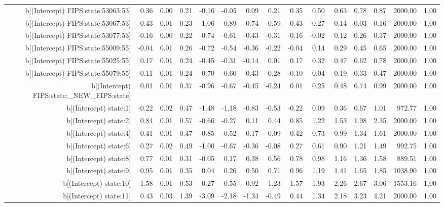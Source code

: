 \begin{table}[ht]
\begin{tabular}{rrrrrrrrrrrrrrr}
  b[(Intercept) FIPS:state:53063:53] & 0.36 & 0.00 & 0.21 & -0.16 & -0.05 & 0.09 & 0.21 & 0.35 & 0.50 & 0.63 & 0.78 & 0.87 & 2000.00 & 1.00 \\ 
  b[(Intercept) FIPS:state:53067:53] & -0.43 & 0.01 & 0.23 & -1.06 & -0.89 & -0.74 & -0.59 & -0.43 & -0.27 & -0.14 & 0.03 & 0.16 & 2000.00 & 1.00 \\ 
  b[(Intercept) FIPS:state:53077:53] & -0.16 & 0.00 & 0.22 & -0.74 & -0.61 & -0.43 & -0.31 & -0.16 & -0.02 & 0.12 & 0.26 & 0.37 & 2000.00 & 1.00 \\ 
  b[(Intercept) FIPS:state:55009:55] & -0.04 & 0.01 & 0.26 & -0.72 & -0.54 & -0.36 & -0.22 & -0.04 & 0.14 & 0.29 & 0.45 & 0.65 & 2000.00 & 1.00 \\ 
  b[(Intercept) FIPS:state:55025:55] & 0.17 & 0.01 & 0.24 & -0.45 & -0.31 & -0.14 & 0.01 & 0.17 & 0.32 & 0.47 & 0.62 & 0.78 & 2000.00 & 1.00 \\ 
  b[(Intercept) FIPS:state:55079:55] & -0.11 & 0.01 & 0.24 & -0.70 & -0.60 & -0.43 & -0.28 & -0.10 & 0.04 & 0.19 & 0.33 & 0.47 & 2000.00 & 1.00 \\ 
  b[(Intercept) FIPS:state:\_NEW\_FIPS:state] & 0.01 & 0.01 & 0.37 & -0.96 & -0.67 & -0.45 & -0.24 & 0.01 & 0.25 & 0.48 & 0.74 & 0.99 & 2000.00 & 1.00 \\ 
  b[(Intercept) state:1] & -0.22 & 0.02 & 0.47 & -1.48 & -1.18 & -0.83 & -0.53 & -0.22 & 0.09 & 0.36 & 0.67 & 1.01 & 972.77 & 1.00 \\ 
  b[(Intercept) state:2] & 0.84 & 0.01 & 0.57 & -0.66 & -0.27 & 0.11 & 0.44 & 0.85 & 1.22 & 1.53 & 1.98 & 2.35 & 2000.00 & 1.00 \\ 
  b[(Intercept) state:4] & 0.41 & 0.01 & 0.47 & -0.85 & -0.52 & -0.17 & 0.09 & 0.42 & 0.73 & 0.99 & 1.34 & 1.61 & 2000.00 & 1.00 \\ 
  b[(Intercept) state:6] & 0.27 & 0.02 & 0.49 & -1.00 & -0.67 & -0.36 & -0.08 & 0.27 & 0.61 & 0.90 & 1.21 & 1.49 & 992.75 & 1.00 \\ 
  b[(Intercept) state:8] & 0.77 & 0.01 & 0.31 & -0.05 & 0.17 & 0.38 & 0.56 & 0.78 & 0.98 & 1.16 & 1.36 & 1.58 & 889.51 & 1.00 \\ 
  b[(Intercept) state:9] & 0.95 & 0.01 & 0.35 & 0.04 & 0.26 & 0.50 & 0.71 & 0.96 & 1.19 & 1.41 & 1.65 & 1.85 & 1038.90 & 1.00 \\ 
  b[(Intercept) state:10] & 1.58 & 0.01 & 0.53 & 0.27 & 0.55 & 0.92 & 1.23 & 1.57 & 1.93 & 2.26 & 2.67 & 3.06 & 1553.16 & 1.00 \\ 
  b[(Intercept) state:11] & 0.43 & 0.03 & 1.39 & -3.09 & -2.18 & -1.34 & -0.49 & 0.44 & 1.34 & 2.18 & 3.23 & 4.21 & 2000.00 & 1.00 \\ 

\end{tabular}
\end{table}
